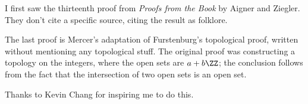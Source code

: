 \documentclass[11pt,paper=letter]{scrartcl}
\begin{document}
I first saw the thirteenth proof from \emph{Proofs from the Book} by Aigner and Ziegler. They don't cite a specific source, citing the result as folklore.

The last proof is Mercer's adaptation of Furstenburg's topological proof, written without mentioning any topological stuff. The original proof was constructing a topology on the integers, where the open sets are $a + b \ZZ$; the conclusion follows from the fact that the intersection of two open sets is an open set.

Thanks to Kevin Chang for inspiring me to do this.
\end{document}
